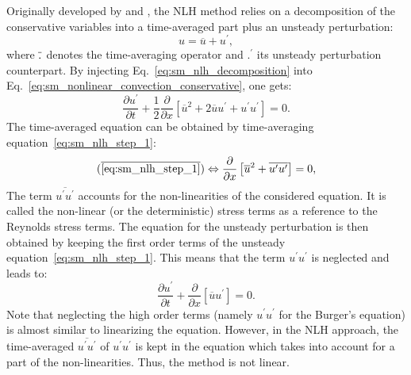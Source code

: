
Originally developed by \citet{He1998} and \citet{Ning1998},
the NLH method
relies on a decomposition of the conservative variables into a
time-averaged part plus an unsteady perturbation:
\begin{equation}
	u = \overline{u} + u^\prime,
	\label{eq:sm_nlh_decomposition}
\end{equation}
where $\overline{\vphantom{u}.}$ denotes the time-averaging operator and
$.^\prime$ its unsteady perturbation counterpart.
By injecting Eq.~\eqref{eq:sm_nlh_decomposition} into
Eq.~\eqref{eq:sm_nonlinear_convection_conservative}, one gets:
\begin{equation}
	\frac{\partial u^\prime}{\partial t} + 
	\frac{1}{2}\frac{\partial}{\partial x} \left[
	\overline{u}^2 + 2 \overline{u} u^\prime + u^\prime u^\prime \right] = 
	0.
	\label{eq:sm_nlh_step_1}
\end{equation}
The time-averaged equation can be obtained by time-averaging
equation~\ref{eq:sm_nlh_step_1}:
\begin{equation}
	(\overline{\ref{eq:sm_nlh_step_1}})
	\Leftrightarrow
	\frac{\partial}{\partial x}
	\left[\overline{u}^2 + 
	\overline{u^\prime u^\prime}\right] =
	0,
	\label{eq:sm_nlh_step_2}
\end{equation}
The term $\overline{u^\prime u^\prime}$
accounts for the non-linearities of the considered equation. It
is called the non-linear 
(or the deterministic) stress terms as a reference to 
the Reynolds stress terms. 
The equation for the unsteady perturbation is then obtained by keeping
the first order terms of the unsteady equation~\ref{eq:sm_nlh_step_1}.
This means that the term $u^\prime u^\prime$ is neglected and leads
to:
\begin{equation}
	\frac{\partial u^\prime}{\partial t} + 
	\frac{\partial}{\partial x} \left[\overline{u} u^\prime \right] = 
	0.
\end{equation}
Note that neglecting the high order terms 
(namely $u^\prime u^\prime$ for the Burger's equation) 
is almost similar to
linearizing the equation. However, in the NLH approach,
the time-averaged $\overline{u^\prime u^\prime}$ 
of $u^\prime u^\prime$ is kept in the
equation which takes into account for a part of the
non-linearities. Thus, the method is not linear.

